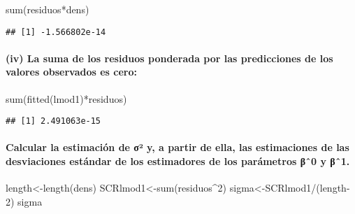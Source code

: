 \documentclass[
]{article}
\newenvironment{Shaded}{\begin{snugshade}}{\end{snugshade}}
\newcommand{\DecValTok}[1]{\textcolor[rgb]{0.00,0.00,0.81}{#1}}
\newcommand{\FunctionTok}[1]{\textcolor[rgb]{0.00,0.00,0.00}{#1}}
\newcommand{\NormalTok}[1]{#1}
\newcommand{\OtherTok}[1]{\textcolor[rgb]{0.56,0.35,0.01}{#1}}
\newcommand{\SpecialCharTok}[1]{\textcolor[rgb]{0.00,0.00,0.00}{#1}}
\begin{document}
\begin{Shaded}
\begin{Highlighting}[]
\FunctionTok{sum}\NormalTok{(residuos}\SpecialCharTok{*}\NormalTok{dens)}
\end{Highlighting}
\end{Shaded}

\begin{verbatim}
## [1] -1.566802e-14
\end{verbatim}

\hypertarget{iv-la-suma-de-los-residuos-ponderada-por-las-predicciones-de-los-valores-observados-es-cero}{%
\paragraph{(iv) La suma de los residuos ponderada por las predicciones
de los valores observados es
cero:}\label{iv-la-suma-de-los-residuos-ponderada-por-las-predicciones-de-los-valores-observados-es-cero}}

\begin{Shaded}
\begin{Highlighting}[]
\FunctionTok{sum}\NormalTok{(}\FunctionTok{fitted}\NormalTok{(lmod1)}\SpecialCharTok{*}\NormalTok{residuos)}
\end{Highlighting}
\end{Shaded}

\begin{verbatim}
## [1] 2.491063e-15
\end{verbatim}

\hypertarget{calcular-la-estimaciuxf3n-de-ux3c3uxb2-y-a-partir-de-ella-las-estimaciones-de-las-desviaciones-estuxe1ndar-de-los-estimadores-de-los-paruxe1metros-ux3b2ux2c60-y-ux3b2ux2c61.}{%
\paragraph{Calcular la estimación de σ² y, a partir de ella, las
estimaciones de las desviaciones estándar de los estimadores de los
parámetros βˆ0 y
βˆ1.}\label{calcular-la-estimaciuxf3n-de-ux3c3uxb2-y-a-partir-de-ella-las-estimaciones-de-las-desviaciones-estuxe1ndar-de-los-estimadores-de-los-paruxe1metros-ux3b2ux2c60-y-ux3b2ux2c61.}}

\begin{Shaded}
\begin{Highlighting}[]
\NormalTok{length}\OtherTok{\textless{}{-}}\FunctionTok{length}\NormalTok{(dens)}
\NormalTok{SCRlmod1}\OtherTok{\textless{}{-}}\FunctionTok{sum}\NormalTok{(residuos}\SpecialCharTok{\^{}}\DecValTok{2}\NormalTok{)}
\NormalTok{sigma}\OtherTok{\textless{}{-}}\NormalTok{SCRlmod1}\SpecialCharTok{/}\NormalTok{(length}\DecValTok{{-}2}\NormalTok{)}
\NormalTok{sigma}
\end{Highlighting}
\end{Shaded}
\end{document}
